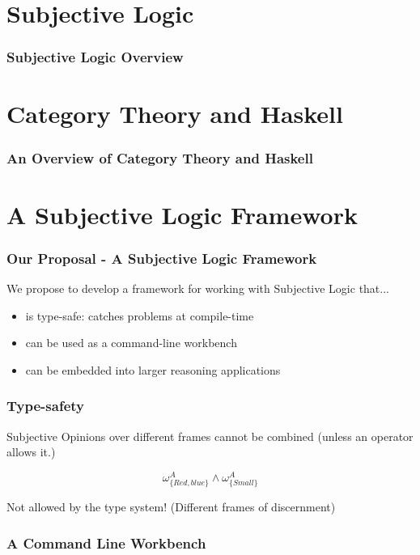 \documentclass{beamer}
\begin{document}
\section{Subjective Logic}


\begin{frame}
\frametitle{Subjective Logic Overview}

\end{frame}


\section{Category Theory and Haskell}

\begin{frame}
\frametitle{An Overview of Category Theory and Haskell}

\end{frame}


\section{A Subjective Logic Framework}

\begin{frame}
\frametitle{Our Proposal - A Subjective Logic Framework}

\par
We propose to develop a framework for working with Subjective Logic that...

\pause

\begin{itemize}
  \item is type-safe: catches problems at compile-time
  \item can be used as a command-line workbench
  \item can be embedded into larger reasoning applications
\end{itemize}

\end{frame}

\begin{frame}
\frametitle{Type-safety}

\par
Subjective Opinions over different frames cannot be combined (unless an operator
allows it.)

\pause

$$ \omega_{ \{Red, blue\} }^{A} \land \omega_{ \{ Small \} }^{A} $$

\pause

\par
Not allowed by the type system! (Different frames of discernment)

\end{frame}

\begin{frame}
\frametitle{A Command Line Workbench}


\end{frame}

\end{document}
